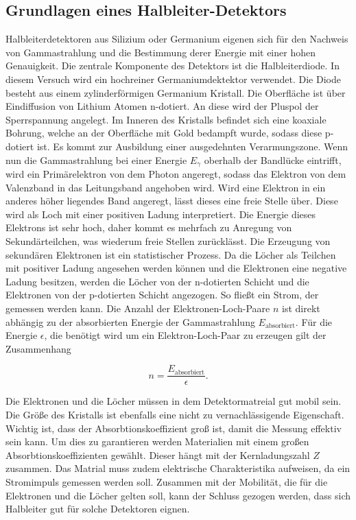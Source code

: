 \subsection{Grundlagen eines Halbleiter-Detektors}
\label{sec:Halbleiter-Detektor}

Halbleiterdetektoren aus Silizium oder Germanium eigenen sich für den Nachweis von Gammastrahlung und die Bestimmung derer Energie mit einer hohen Genauigkeit.
Die zentrale Komponente des Detektors ist die Halbleiterdiode. In diesem Versuch wird ein hochreiner Germaniumdektektor verwendet.
Die Diode besteht aus einem zylinderförmigen Germanium Kristall. Die Oberfläche ist über Eindiffusion von Lithium Atomen n-dotiert.
An diese wird der Pluspol der Sperrspannung angelegt. Im Inneren des Kristalls befindet sich eine koaxiale Bohrung, welche an der Oberfläche mit Gold bedampft wurde, sodass diese p-dotiert ist.
Es kommt zur Ausbildung einer ausgedehnten Verarmungszone. Wenn nun die Gammastrahlung bei einer Energie $E_{\gamma}$ oberhalb der Bandlücke eintrifft, wird ein Primärelektron von dem Photon angeregt, sodass das Elektron von dem Valenzband in das Leitungsband angehoben wird. Wird eine Elektron in ein anderes höher liegendes Band angeregt, lässt dieses eine freie Stelle über. 
Diese wird als Loch mit einer positiven Ladung interpretiert.
Die Energie dieses Elektrons ist sehr hoch, daher kommt es mehrfach zu Anregung von Sekundärteilchen, was wiederum freie Stellen zurücklässt. Die Erzeugung von sekundären Elektronen ist ein statistischer Prozess.
Da die Löcher als Teilchen mit positiver Ladung angesehen werden können und die Elektronen eine negative Ladung besitzen, werden die Löcher von der n-dotierten Schicht und die Elektronen von der p-dotierten Schicht angezogen.
So fließt ein Strom, der gemessen werden kann.
Die Anzahl der Elektronen-Loch-Paare $n$ ist direkt abhängig zu der absorbierten Energie der Gammastrahlung $E_{\text{absorbiert}}$. Für die Energie $\epsilon$, die benötigt wird
um ein Elektron-Loch-Paar zu erzeugen gilt der Zusammenhang

\begin{equation}
    n = \frac{E_{\text{absorbiert}}}{\epsilon}.
\end{equation}

Die Elektronen und die Löcher müssen in dem Detektormatreial gut mobil sein. Die Größe des Kristalls ist ebenfalls eine nicht zu vernachlässigende Eigenschaft.
Wichtig ist, dass der Absorbtionskoeffizient groß ist, damit die Messung effektiv sein kann. Um dies zu garantieren werden Materialien mit einem großen Absorbtionskoeffizienten
gewählt. Dieser hängt mit der Kernladungszahl $Z$ zusammen. Das Matrial muss zudem elektrische Charakteristika aufweisen, da ein Stromimpuls gemessen werden soll. Zusammen mit der Mobilität, die für die
Elektronen und die Löcher gelten soll, kann der Schluss gezogen werden, dass sich Halbleiter gut für solche Detektoren eignen.

